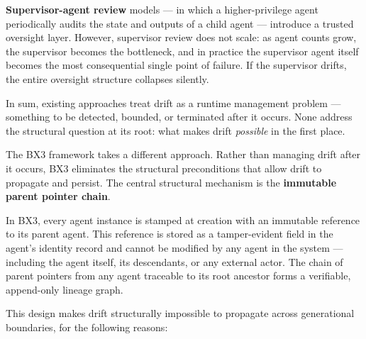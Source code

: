\textbf{Supervisor-agent review} models — in which a higher-privilege agent periodically audits the state and outputs of a child agent — introduce a trusted oversight layer. However, supervisor review does not scale: as agent counts grow, the supervisor becomes the bottleneck, and in practice the supervisor agent itself becomes the most consequential single point of failure. If the supervisor drifts, the entire oversight structure collapses silently.

In sum, existing approaches treat drift as a runtime management problem — something to be detected, bounded, or terminated after it occurs. None address the structural question at its root: what makes drift \textit{possible} in the first place.


The BX3 framework takes a different approach. Rather than managing drift after it occurs, BX3 eliminates the structural preconditions that allow drift to propagate and persist. The central structural mechanism is the \textbf{immutable parent pointer chain}.

In BX3, every agent instance is stamped at creation with an immutable reference to its parent agent. This reference is stored as a tamper-evident field in the agent's identity record and cannot be modified by any agent in the system — including the agent itself, its descendants, or any external actor. The chain of parent pointers from any agent traceable to its root ancestor forms a verifiable, append-only lineage graph.

This design makes drift structurally impossible to propagate across generational boundaries, for the following reasons:

